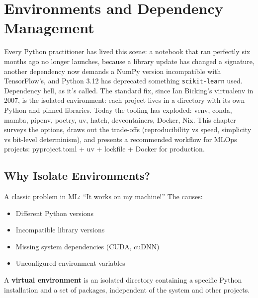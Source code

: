 \chapter{Environments and Dependency Management}
\label{ch:environments}

Every Python practitioner has lived this scene: a notebook that ran perfectly six months ago no longer launches, because a library update has changed a signature, another dependency now demands a NumPy version incompatible with TensorFlow's, and Python 3.12 has deprecated something \texttt{scikit-learn} used. Dependency hell, as it's called. The standard fix, since Ian Bicking's virtualenv in 2007, is the isolated environment: each project lives in a directory with its own Python and pinned libraries. Today the tooling has exploded: venv, conda, mamba, pipenv, poetry, uv, hatch, devcontainers, Docker, Nix. This chapter surveys the options, draws out the trade-offs (reproducibility vs speed, simplicity vs bit-level determinism), and presents a recommended workflow for MLOps projects: pyproject.toml + uv + lockfile + Docker for production.

\section{Why Isolate Environments?}
\label{sec:why-envs}

A classic problem in ML: ``It works on my machine!'' The causes:
\begin{itemize}
  \item Different Python versions
  \item Incompatible library versions
  \item Missing system dependencies (CUDA, cuDNN)
  \item Unconfigured environment variables
\end{itemize}

\begin{definition}
A \textbf{virtual environment} is an isolated
directory containing a specific Python installation and a set of packages,
independent of the system and other projects.
\end{definition}

